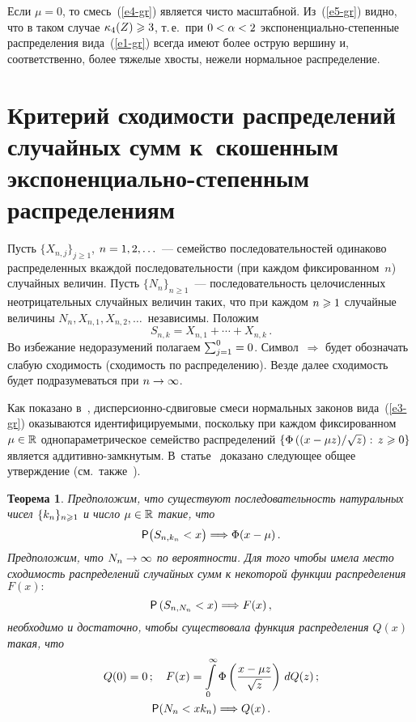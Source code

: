 \begin{multicols}{2}
Если $\mu=0$, то смесь~(\ref{e4-gr}) является чисто масштабной. Из~(\ref{e5-gr}) видно, что в таком 
случае $\kappa_4(Z)\hm\geqslant 3$, т.\,е.\ при $0\hm<\alpha\hm<2$ 
экс\-по\-нен\-ци\-аль\-но-сте\-пен\-ные распределения вида~(\ref{e1-gr}) 
всегда имеют более острую 
вершину и, соответственно, более тяжелые хвосты, нежели нормальное  распределение.

\section{Критерий сходимости распределений случайных сумм 
к~скошенным экспоненциально-степенным распределениям}

Пусть $\{X_{n,j}\}_{j\geqslant1}$, $n\hm=1,2,\ldots$~--- семейство
по\-следовательностей одинаково распределенных в\linebreak каж\-дой последовательности (при 
каждом фиксированном~$n$) случайных величин. Пусть $\{N_n\}_{n\geqslant1}$~--- 
последовательность целочисленных неотрицательных случайных величин таких, что 
пpи каждом $n\hm\geqslant1$ случайные величины $N_n,X_{n,1},X_{n,2},\ldots$\ 
независимы. Положим
$$
S_{n,k}=X_{n,1}+\cdots +X_{n,k}\,.
$$
Во избежание недоразумений полагаем $\sum_{j=1}^0\hm=0$. Символ~$\Longrightarrow$ 
будет обозначать слабую сходимость (сходимость по
распределению). Везде далее сходимость будет подразумеваться при $n\hm\to\infty$.

\smallskip

Как показано в~\cite{Korolev2012TVP}, дис\-пер\-си\-он\-но-сдвиго\-вые смеси нормальных 
законов вида~(\ref{e3-gr}) оказываются идентифицируемыми, поскольку при каждом 
фиксированном $\mu\hm\in\mathbb{R}$ однопараметрическое семейство распределений 
$\left\{\Phi\left((x-\mu z)/\sqrt{z}\right):\,z\hm\geqslant0\right\}$ является 
ад\-ди\-тив\-но-замкну\-тым. В~статье~\cite{Korolev2012TVP} доказано следующее общее 
утверждение (см.\ так\-же~\cite{ZaksKorolev2013}).

\smallskip

\noindent
\textbf{Теорема 1}. \textit{Предположим, что существуют последовательность
натуральных чисел $\{k_n\}_{n\hm\geqslant1}$ и число $\mu\hm\in\mathbb{R}$ такие, что}
\begin{equation}
{\sf P}\big(S_{n,k_n}<x\big)\Longrightarrow \Phi(x-\mu)\,.\label{e6-gr}
\end{equation}
\textit{Предположим, что $N_n\hm\to\infty$ по вероятности. Для того чтобы имела
место сходимость распределений случайных сумм к некоторой функции
распределения} $F(x):$
$$
{\sf P}\left(S_{n,N_n}<x\right)\Longrightarrow F(x)\,,
$$
\textit{необходимо и достаточно, чтобы существовала функция распределения
$Q(x)$ такая, что} 
\begin{gather*}
Q(0)=0\,;\quad
F(x)=\int\limits_{0}^{\infty}\Phi\left(\fr{x-\mu
z}{\sqrt{z}}\right)\,dQ(z) \,;\label{e7-gr}
\\
{\sf P}(N_n<xk_n)\Longrightarrow Q(x)\,. %
\end{gather*}



\end{multicols}
